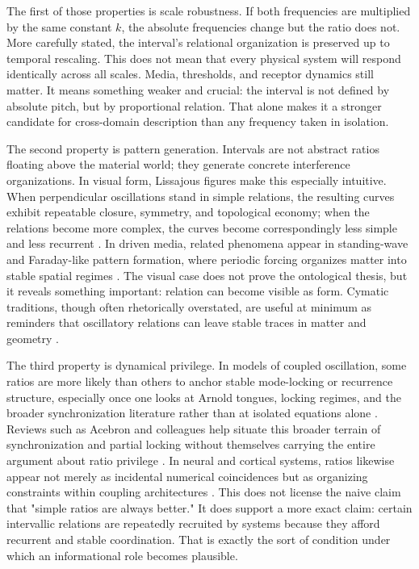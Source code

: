 The first of those properties is scale robustness. If both frequencies are multiplied by the same constant $k$, the absolute frequencies change but the ratio does not. More carefully stated, the interval's relational organization is preserved up to temporal rescaling. This does not mean that every physical system will respond identically across all scales. Media, thresholds, and receptor dynamics still matter. It means something weaker and crucial: the interval is not defined by absolute pitch, but by proportional relation. That alone makes it a stronger candidate for cross-domain description than any frequency taken in isolation.

The second property is pattern generation. Intervals are not abstract ratios floating above the material world; they generate concrete interference organizations. In visual form, Lissajous figures make this especially intuitive. When perpendicular oscillations stand in simple relations, the resulting curves exhibit repeatable closure, symmetry, and topological economy; when the relations become more complex, the curves become correspondingly less simple and less recurrent \parencite{lissajous_1857,gallozzi_2023}. In driven media, related phenomena appear in standing-wave and Faraday-like pattern formation, where periodic forcing organizes matter into stable spatial regimes \parencite{engels_2007,nguyen_2019}. The visual case does not prove the ontological thesis, but it reveals something important: relation can become visible as form. Cymatic traditions, though often rhetorically overstated, are useful at minimum as reminders that oscillatory relations can leave stable traces in matter and geometry \parencite{jenny_1967}.

The third property is dynamical privilege. In models of coupled oscillation, some ratios are more likely than others to anchor stable mode-locking or recurrence structure, especially once one looks at Arnold tongues, locking regimes, and the broader synchronization literature rather than at isolated equations alone \parencite{kuramoto_1984,strogatz_2000}. Reviews such as Acebron and colleagues help situate this broader terrain of synchronization and partial locking without themselves carrying the entire argument about ratio privilege \parencite{acebron_2005}. In neural and cortical systems, ratios likewise appear not merely as incidental numerical coincidences but as organizing constraints within coupling architectures \parencite{canolty_2010,jacobs_2025}. This does not license the naive claim that "simple ratios are always better." It does support a more exact claim: certain intervallic relations are repeatedly recruited by systems because they afford recurrent and stable coordination. That is exactly the sort of condition under which an informational role becomes plausible.

